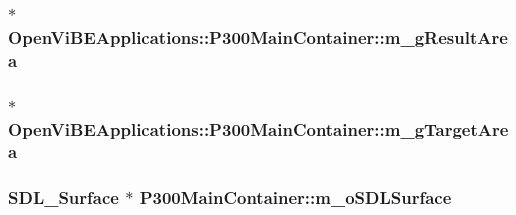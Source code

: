 \label{classOpenViBEApplications_1_1P300MainContainer_a922413bfcce731559ce2532760143a5b}
\hypertarget{classOpenViBEApplications_1_1P300MainContainer_a2aea9eec1dc46d9308b9c5000a061cda}{
\subsubsection[{m\_\-gResultArea}]{$\ast$ {\bf OpenViBEApplications::P300MainContainer::m\_\-gResultArea}}}
\label{classOpenViBEApplications_1_1P300MainContainer_a2aea9eec1dc46d9308b9c5000a061cda}
\hypertarget{classOpenViBEApplications_1_1P300MainContainer_aa573cdc09f41bdcb6f149b99fc8c1e0a}{
\subsubsection[{m\_\-gTargetArea}]{$\ast$ {\bf OpenViBEApplications::P300MainContainer::m\_\-gTargetArea}}}
\label{classOpenViBEApplications_1_1P300MainContainer_aa573cdc09f41bdcb6f149b99fc8c1e0a}
\hypertarget{classOpenViBEApplications_1_1P300MainContainer_a677b182f627d403aa79fcdf32d573e3c}{
\subsubsection[{m\_\-oSDLSurface}]{\setlength{\rightskip}{0pt plus 5cm}SDL\_\-Surface $\ast$ {\bf P300MainContainer::m\_\-oSDLSurface}}}
\label{classOpenViBEApplications_1_1P300MainContainer_a677b182f627d403aa79fcdf32d573e3c}
